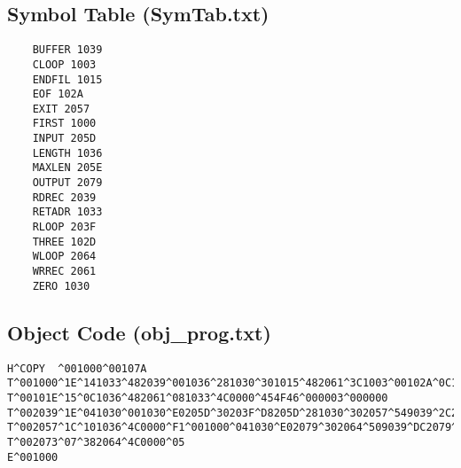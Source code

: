 \documentclass[12pt]{article}
\begin{document}
\subsection{Symbol Table (SymTab.txt)}
\begin{verbatim}
    BUFFER 1039
    CLOOP 1003
    ENDFIL 1015
    EOF 102A
    EXIT 2057
    FIRST 1000
    INPUT 205D
    LENGTH 1036
    MAXLEN 205E
    OUTPUT 2079
    RDREC 2039
    RETADR 1033
    RLOOP 203F
    THREE 102D
    WLOOP 2064
    WRREC 2061
    ZERO 1030    
\end{verbatim}

\subsection{Object Code (obj\_prog.txt)}
\begin{verbatim}
H^COPY  ^001000^00107A
T^001000^1E^141033^482039^001036^281030^301015^482061^3C1003^00102A^0C1039^00102D
T^00101E^15^0C1036^482061^081033^4C0000^454F46^000003^000000
T^002039^1E^041030^001030^E0205D^30203F^D8205D^281030^302057^549039^2C205E^38203F
T^002057^1C^101036^4C0000^F1^001000^041030^E02079^302064^509039^DC2079^2C1036
T^002073^07^382064^4C0000^05
E^001000
\end{verbatim}
\end{document}
